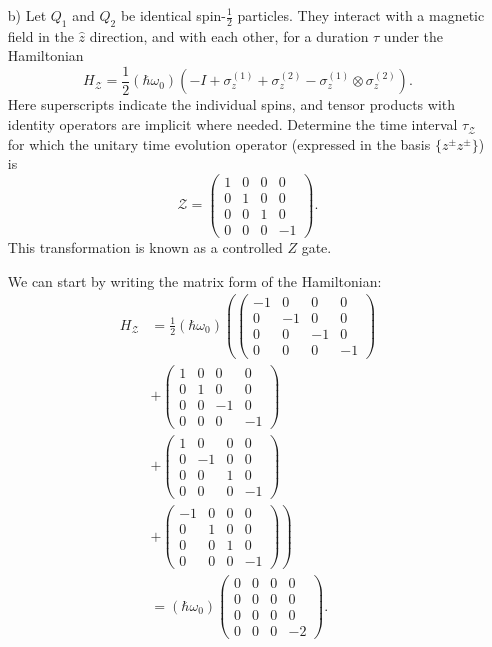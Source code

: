 \documentclass[a4paper,twoside]{article}
\begin{document}
\begin{itemize}
    \item[b)] Let $Q_1$ and $Q_2$ be identical spin-$\frac{1}{2}$ particles. They interact with a magnetic field in the $\hat{z}$ direction, and with each other, for a duration $\tau$ under the Hamiltonian
\begin{equation}
    H_\mathcal{Z} = \frac{1}{2}(\hbar\omega_0)\left( -I+\sigma_z^{(1)} + \sigma_z^{(2)} - \sigma_z^{(1)} \otimes \sigma_z^{(2)} \right).
\end{equation}
Here superscripts indicate the individual spins, and tensor products with identity operators are implicit where needed. Determine the time interval $\tau_\mathcal{Z}$ for which the unitary time evolution operator (expressed in the basis $\{z^\pm z^\pm\} $) is
\begin{equation}
    \mathcal{Z} = \begin{pmatrix} 1&0&0&0\\0&1&0&0\\0&0&1&0\\0&0&0&-1\end{pmatrix}.
\end{equation}
This transformation is known as a controlled $Z$ gate.
\begin{tcolorbox}[breakable]
    We can start by writing the matrix form of the Hamiltonian:
    \begin{align*}
        H_\mathcal{Z} &= \frac{1}{2}(\hbar\omega_0)\left(\begin{pmatrix} -1&0&0&0\\0&-1&0&0\\0&0&-1&0\\0&0&0&-1 \end{pmatrix}\right.\\
    &+ \begin{pmatrix} 1&0&0&0\\0&1&0&0\\0&0&-1&0\\0&0&0&-1 \end{pmatrix}\\
&+ \begin{pmatrix} 1&0&0&0\\0&-1&0&0\\0&0&1&0\\0&0&0&-1 \end{pmatrix}\\
&+\left. \begin{pmatrix} -1&0&0&0\\0&1&0&0\\0&0&1&0\\0&0&0&-1 \end{pmatrix} \right)\\
&=(\hbar\omega_0)\begin{pmatrix}0&0&0&0\\0&0&0&0\\0&0&0&0\\0&0&0&-2 \end{pmatrix} 
    .\end{align*}


\end{tcolorbox}
\end{itemize}
\end{document}
